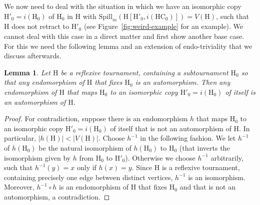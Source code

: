 \documentclass[a4paper,12pt]{article}
\newtheorem{lemma}{Lemma}
\theoremstyle{remark}
\newcommand{\HC}[0]{\ensuremath{\mathrm{HC}}}
\renewcommand{\H}{\ensuremath{\mathrm{H}}}
\begin{document}

We now need to deal with the situation in which we have an isomorphic copy $\H'_0=i(\H_0)$ of $\H_0$ in $\H$ with $\mathrm{Spill}_m(\H[\H'_0,i(\HC_0)])=V(\H)$, such that $\H$ does not retract to $\H'_0$ (see Figure~\ref{fig:weird-example} for an example). We cannot deal with this case in a direct matter and first show another base case. For this we need the following lemma and an extension of endo-triviality that we discuss afterwards.

\begin{lemma}
Let $\H$ be a reflexive tournament, containing a subtournament $\H_0$ so that any endomorphism of $\H$ that fixes $\H_0$ is an automorphism. Then any endomorphism of $\H$ that maps $\H_0$ to an isomorphic copy $\H'_0=i(\H_0)$ of itself is an automorphism of $\H$. 
\label{lem:7}
\end{lemma}
\begin{proof}
For contradiction, suppose there is an endomorphism $h$ that maps $\H_0$ to an isomorphic copy $\H'_0=i(\H_0)$ of itself that is not an automorphism of $\H$. In particular, $|h(\H)|<|V(\H)|$. Choose $h^{-1}$ in the following fashion. We let $h^{-1}$ of $h(\H_0)$ be the natural isomorphism of $h(\H_0)$ to $\H_0$ (that inverts the isomorphism given by $h$ from $\H_0$ to $\H'_0$). Otherwise we choose $h^{-1}$ arbitrarily, such that $h^{-1}(y)=x$ only if $h(x)=y$. Since $\H$ is a reflexive tournament, containing precisely one edge between distinct vertices, $h^{-1}$ is an isomorphism. Moreover, $h^{-1} \circ h$ is an endomorphism of $\H$ that fixes $\H_0$ and that is not an automorphism, a contradiction.
\end{proof}
\end{document}
